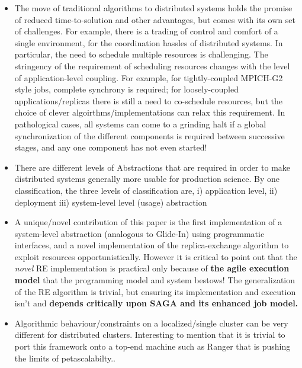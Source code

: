 \documentclass{rspublic}
\begin{document}
\begin{itemize}

\item The move of traditional algorithms to distributed systems holds
  the promise of reduced time-to-solution and other advantages, but
  comes with its own set of challenges. For example, there is a
  trading of control and comfort of a single environment, for the
  coordination hassles of distributed systems. In particular, the need
  to schedule multiple resources is challenging. The stringency of the
  requirement of scheduling resources changes with the level of
  application-level coupling. For example, for tightly-coupled
  MPICH-G2 style jobs, complete synchrony is required; for
  loosely-coupled applications/replicas there is still a need to
  co-schedule resources, but the choice of clever
  algoirthms/implementations can relax this requirement. In
  pathological cases, all systems can come to a grinding halt if a
  global synchronization of the different components is required
  between successive stages, and any one component has not even
  started!

\item There are different levels of Abstractions  that are required
  in order to make distributed systems generally more usable for
  production science. By one classification, the three levels of
  classification are, i) application level, ii) deployment iii) system-level
  level (usage) abstraction

\item A unique/novel contribution of this paper is the first
  implementation of a system-level abstraction (analogous to Glide-In)
  using programmatic interfaces, and a novel implementation of the
  replica-exchange algorithm to exploit resources opportunistically.
  However it is critical to point out that the {\it novel} RE
  implementation is practical only because of {\bf the agile execution
    model} that the programming model and system bestows! The
  generalization of the RE algorithm is trivial, but ensuring its
  implementation and execution isn't and {\bf depends critically upon
    SAGA and its enhanced job model.}

\item Algorithmic behaviour/constraints on a localized/single cluster
  can be very different for distributed clusters. Interesting to
  mention that it is trivial to port this framework onto a top-end
  machine such as Ranger that is pushing the limits of petascalabilty..

\end{itemize}
          
\end{document}
